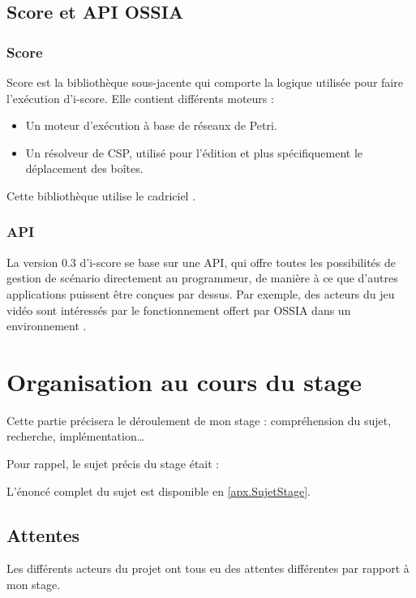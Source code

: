 \subsection{Score et API OSSIA}
\subsubsection{Score}
Score est la bibliothèque sous-jacente qui comporte la logique utilisée pour faire l'exécution d'i-score. Elle contient différents moteurs :

\begin{itemize}
	\item Un moteur d'exécution à base de réseaux de Petri.
	\item Un résolveur de \ac{CSP}, utilisé pour l'édition et plus spécifiquement le déplacement des boîtes.
\end{itemize}

Cette bibliothèque utilise le cadriciel .

\subsubsection{API}
La version 0.3 d'i-score se base sur une \ac{API}, qui offre toutes les possibilités de gestion de scénario directement au programmeur, de manière à ce que d'autres applications puissent être conçues par dessus. Par exemple, des acteurs du jeu vidéo sont intéressés par le fonctionnement offert par \ac{OSSIA} dans un environnement . 

\section{Organisation au cours du stage}
Cette partie précisera le déroulement de mon stage : compréhension du sujet, recherche, implémentation\dots

Pour rappel, le sujet précis du stage était : 
\begin{center}
	\noindent{}
\end{center}

L'énoncé complet du sujet est disponible en \cref{apx.SujetStage}.
\subsection{Attentes}
\label{sectionAttentes}
Les différents acteurs du projet ont tous eu des attentes différentes par rapport à mon stage.

